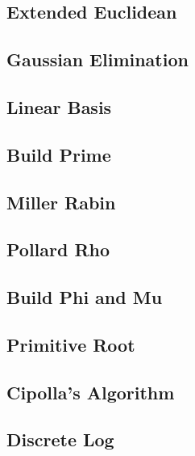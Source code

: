 \documentclass[a4paper,10pt,twocolumn,oneside]{article}
\begin{document}
\subsection{Extended Euclidean}


\subsection{Gaussian Elimination}


\subsection{Linear Basis}


\subsection{Build Prime}


\subsection{Miller Rabin}


\subsection{Pollard Rho}


\subsection{Build Phi and Mu}


\subsection{Primitive Root}


\subsection{Cipolla's Algorithm}


\subsection{Discrete Log}

\end{document}
